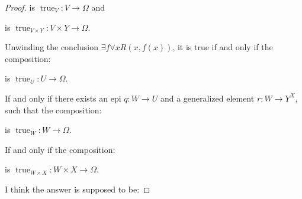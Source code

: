 \documentclass[a4paper]{article}
\DeclareMathOperator{\true}{\text {true}}
\begin{document}
\begin{proof}
    is $\true_V:V\to \Omega$ and 

    \begin{center}
    \end{center}

    is $\true_{V\times Y}: V\times Y \to \Omega$.

    Unwinding the conclusion $\exists f\forall x R(x,f(x))$, it is true if and only if the composition:

    \begin{center}
    \end{center}

    is $\true_U:U\to\Omega$. 

    If and only if there exists an epi $q:W\to U$ and a generalized element $r:W\to Y^X$, such that the composition:

    \begin{center}
    \end{center}

    is $\true_W:W\to \Omega$. 

    If and only if the composition:

    \begin{center}
    \end{center}

    is $\true_{W\times X}:W\times X \to\Omega$.

    I think the answer is supposed to be: 


\end{proof}
\end{document}
